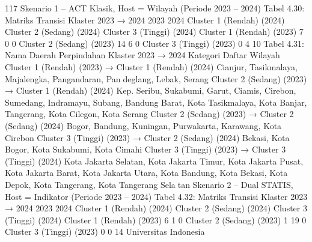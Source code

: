 117
Skenario 1 – ACT Klasik, Host = Wilayah (Periode 2023 – 2024)
Tabel 4.30: Matriks Transisi Klaster 2023 → 2024
2023
2024 Cluster 1 (Rendah) (2024) Cluster 2 (Sedang) (2024) Cluster 3 (Tinggi) (2024)
Cluster 1 (Rendah) (2023) 7 0 0
Cluster 2 (Sedang) (2023) 14 6 0
Cluster 3 (Tinggi) (2023) 0 4 10
Tabel 4.31: Nama Daerah Perpindahan Klaster 2023 → 2024
Kategori Daftar Wilayah
Cluster 1 (Rendah)
(2023) → Cluster 1
(Rendah) (2024)
Cianjur, Tasikmalaya, Majalengka, Pangandaran, Pandeglang, Lebak, Serang
Cluster 2 (Sedang)
(2023) → Cluster 1
(Rendah) (2024)
Kep. Seribu, Sukabumi, Garut, Ciamis, Cirebon, Sumedang,
Indramayu, Subang, Bandung Barat, Kota Tasikmalaya, Kota
Banjar, Tangerang, Kota Cilegon, Kota Serang
Cluster 2 (Sedang)
(2023) → Cluster 2
(Sedang) (2024)
Bogor, Bandung, Kuningan, Purwakarta, Karawang, Kota
Cirebon
Cluster 3 (Tinggi)
(2023) → Cluster 2
(Sedang) (2024)
Bekasi, Kota Bogor, Kota Sukabumi, Kota Cimahi
Cluster 3 (Tinggi)
(2023) → Cluster 3
(Tinggi) (2024)
Kota Jakarta Selatan, Kota Jakarta Timur, Kota Jakarta Pusat,
Kota Jakarta Barat, Kota Jakarta Utara, Kota Bandung, Kota
Bekasi, Kota Depok, Kota Tangerang, Kota Tangerang Selatan
Skenario 2 – Dual STATIS, Host = Indikator (Periode 2023 – 2024)
Tabel 4.32: Matriks Transisi Klaster 2023 → 2024
2023
2024 Cluster 1 (Rendah) (2024) Cluster 2 (Sedang) (2024) Cluster 3 (Tinggi) (2024)
Cluster 1 (Rendah) (2023) 6 1 0
Cluster 2 (Sedang) (2023) 1 19 0
Cluster 3 (Tinggi) (2023) 0 0 14
Universitas Indonesia

